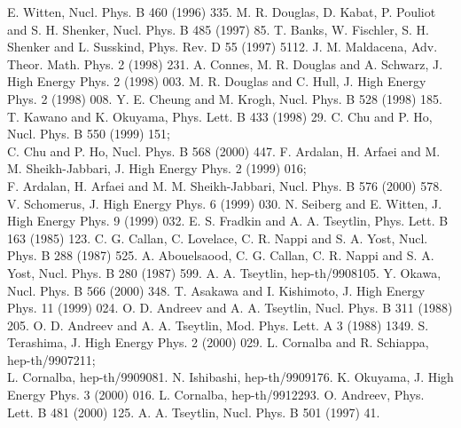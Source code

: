 \documentclass[a4paper,12pt]{article}
\begin{document}
\vspace{0.5cm}
\small
\begin{thebibliography}{99}
 E. Witten, Nucl. Phys. B 460 (1996) 335.
 M. R. Douglas, D. Kabat, P. Pouliot and S. H. Shenker,
Nucl. Phys. B 485 (1997) 85.
 T. Banks, W. Fischler, S. H. Shenker and L. Susskind,
Phys. Rev. D 55 (1997) 5112.
 J. M. Maldacena,
Adv. Theor. Math. Phys. 2 (1998) 231.
 A. Connes, M. R. Douglas and A. Schwarz,
J. High Energy Phys. 2 (1998) 003.
 M. R. Douglas and C. Hull,
J. High Energy Phys. 2 (1998) 008.
 Y. E. Cheung and M. Krogh,
Nucl. Phys. B 528 (1998) 185.
 T. Kawano and K. Okuyama,
Phys. Lett. B 433 (1998) 29.
 C. Chu and P. Ho,
Nucl. Phys. B 550 (1999) 151;\\
C. Chu and P. Ho, Nucl. Phys. B 568 (2000) 447.
 F. Ardalan, H. Arfaei and M. M. Sheikh-Jabbari,
J. High Energy Phys. 2 (1999) 016;\\
F. Ardalan, H. Arfaei and M. M. Sheikh-Jabbari,
Nucl. Phys. B 576 (2000) 578.
 V. Schomerus,
J. High Energy Phys. 6 (1999) 030.
 N. Seiberg and E. Witten,
J. High Energy Phys. 9 (1999) 032.
 E. S. Fradkin and A. A. Tseytlin,
Phys. Lett. B 163 (1985) 123.
 C. G. Callan, C. Lovelace, C. R. Nappi and S. A. Yost,
Nucl. Phys. B 288 (1987) 525.
 A. Abouelsaood, C. G. Callan, C. R. Nappi and S. A. Yost,
Nucl. Phys. B 280 (1987) 599.
 A. A. Tseytlin, hep-th/9908105.
 Y. Okawa, Nucl. Phys. B 566 (2000) 348.
 T. Asakawa and I. Kishimoto,
J. High Energy Phys. 11 (1999) 024.
 O. D. Andreev and A. A. Tseytlin,
Nucl. Phys. B 311 (1988) 205.
 O. D. Andreev and A. A. Tseytlin,
Mod. Phys. Lett. A 3 (1988) 1349.
 S. Terashima,
J. High Energy Phys. 2 (2000) 029.
L. Cornalba and R. Schiappa, hep-th/9907211;\\
L. Cornalba, hep-th/9909081.
 N. Ishibashi, hep-th/9909176.
 K. Okuyama,
J. High Energy Phys. 3 (2000) 016.
 L. Cornalba, hep-th/9912293.
 O. Andreev, Phys. Lett. B 481 (2000) 125.
 A. A. Tseytlin, Nucl. Phys. B 501 (1997) 41.
\end{thebibliography}
\end{document}
